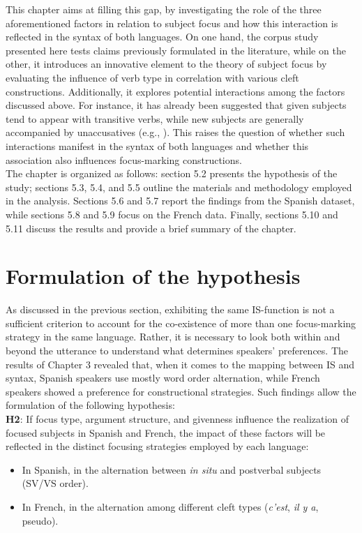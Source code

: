 This chapter aims at filling this gap, by investigating the role of the three aforementioned factors in relation to subject focus and how this interaction is reflected in the syntax of both languages. On one hand, the corpus study presented here tests claims previously formulated in the literature, while on the other, it introduces an innovative element to the theory of subject focus by evaluating the influence of verb type in correlation with various cleft constructions. Additionally, it explores potential interactions among the factors discussed above. For instance, it has already been suggested that given subjects tend to appear with transitive verbs, while new subjects are generally accompanied by unaccusatives (e.g., \cite{du2003preferred}). This raises the question of whether such interactions manifest in the syntax of both languages and whether this association also influences focus-marking constructions.\\
The chapter is organized as follows: section 5.2 presents the hypothesis of the study; sections 5.3, 5.4, and 5.5 outline the materials and methodology employed in the analysis. Sections 5.6 and 5.7 report the findings from the Spanish dataset, while sections 5.8 and 5.9 focus on the French data. Finally, sections 5.10 and 5.11 discuss the results and provide a brief summary of the chapter.

\section{Formulation of the hypothesis}
As discussed in the previous section, exhibiting the same IS-function is not a sufficient criterion to account for the co-existence of more than one focus-marking strategy in the same language. Rather, it is necessary to look both within and beyond the utterance to understand what determines speakers' preferences. The results of Chapter 3 revealed that, when it comes to the mapping between IS and syntax, Spanish speakers use mostly word order alternation, while French speakers showed a preference for constructional strategies. Such findings allow the formulation of the following hypothesis:\\


\textbf{H2}: If focus type, argument structure, and givenness influence the realization of focused subjects in Spanish and French, the impact of these factors will be reflected in the distinct focusing strategies employed by each language:
\begin{itemize}
    \item In Spanish, in the alternation between \textit{in situ} and postverbal subjects (SV/VS order).
    \item In French, in the alternation among different cleft types (\textit{c’est}, \textit{il y a}, pseudo).
\end{itemize}



